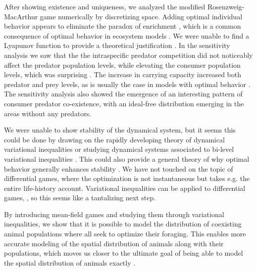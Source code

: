 After showing existence and uniqueness, we analyzed the modified Rosenzweig-MacArthur game numerically by discretizing space. Adding optimal individual behavior appears to eliminate the paradox of enrichment \citep{rosenzweig1971paradox}, which is a common consequence of optimal behavior in ecosystem models \citep{abrams2010implications}. We were unable to find a Lyapunov function to provide a theoretical justification \citep{kvrivan2009evolutionary}. In the sensitivity analysis we saw that the the intraspecific predator competition did not noticeably affect the predator population levels, while elevating the consumer population levels, which was surprising \citep{abrams2010implications}. The increase in carrying capacity increased both predator and prey levels, as is usually the case in models with optimal behavior \citep{valdovinos2010consequences}. The sensitivity analysis also showed the emergence of an interesting pattern of consumer predator co-existence, with an ideal-free distribution emerging in the areas without any predators.


We were unable to show stability of the dynamical system, but it seems this could be done by drawing on the rapidly developing theory of dynamical variational inequalities \citep{adly2018variational,brogliato2020dynamical, tang2020differential} or studying dynamical systems associated to bi-level variational inequalities \citep{anh2021dynamical}. This could also provide a general theory of why optimal behavior generally enhances stability \citep{valdovinos2010consequences}. We have not touched on the topic of differential games, where the optimization is not instantaneous but takes e.g. the entire life-history account. Variational inequalities can be applied to differential games, \citep{pang2008differential}, so this seems like a tantalizing next step.


By introducing mean-field games and studying them through variational inequalities, we show that it is possible to model the distribution of coexisting animal populations where all seek to optimize their foraging. This enables more accurate modeling of the spatial distribution of animals along with their populations, which moves us closer to the ultimate goal of being able to model the spatial distribution of animals exactly \citep{morris2003shadows}.


